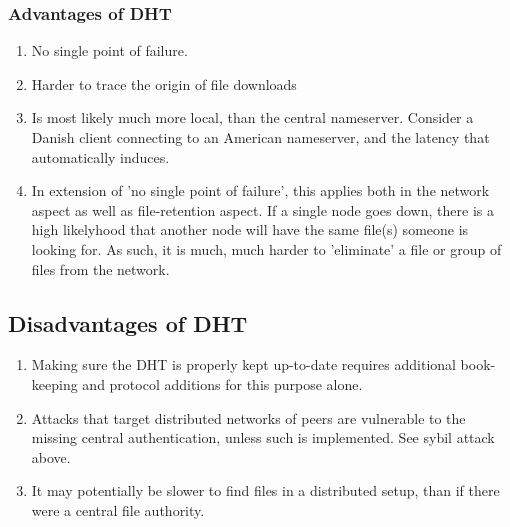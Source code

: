 \subsubsection{Advantages of DHT}
\begin{enumerate}
    \item No single point of failure.
    \item Harder to trace the origin of file downloads
    \item Is most likely much more local, than the central nameserver. Consider
        a Danish client connecting to an American nameserver, and the latency
        that automatically induces.
    \item In extension of 'no single point of failure', this applies both in
        the network aspect as well as file-retention aspect. If a single node
        goes down, there is a high likelyhood that another node will have the
        same file(s) someone is looking for. As such, it is much, much harder
        to 'eliminate' a file or group of files from the network.
\end{enumerate}
\subsection{Disadvantages of DHT}
\begin{enumerate}
    \item Making sure the DHT is properly kept up-to-date requires additional
        book-keeping and protocol additions for this purpose alone.
    \item Attacks that target distributed networks of peers are vulnerable to
        the missing central authentication, unless such is implemented. See
        sybil attack above.
    \item It may potentially be slower to find files in a distributed setup,
        than if there were a central file authority.
\end{enumerate}
